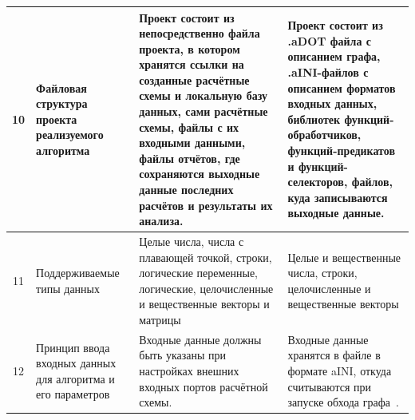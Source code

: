 \begin{landscape}
\begin{longtable}{|c|p{}|p{}|p{}|}
    \hline
    10         & Файловая структура проекта реализуемого алгоритма                                          & Проект состоит из непосредственно файла проекта, в котором хранятся ссылки на созданные расчётные схемы и локальную базу данных, сами расчётные схемы, файлы с их входными данными, файлы отчётов, где сохраняются выходные данные последних расчётов и результаты их анализа.                                                                                                                                                                                                                                                                                                                                                                                    & Проект состоит из \textsf{.aDOT} файла с описанием графа, \textsf{.aINI}-файлов с описанием форматов входных данных, библиотек функций-обработчиков, функций-предикатов и функций-селекторов, файлов, куда записываются выходные данные.                                          \\
    \hline
    11         & Поддерживаемые типы данных                                                                 & Целые числа, числа с плавающей точкой, строки, логические переменные, логические, целочисленные и вещественные векторы и матрицы                                                                                                                                                                                                                                                                                                                                                                                                                                                                                                                                  & Целые и вещественные числа, строки, целочисленные и вещественные векторы                                                                                                                                                                                                          \\
    \hline
    12         & Принцип ввода входных данных для алгоритма и его параметров                                & Входные данные должны быть указаны при настройках внешних входных портов расчётной схемы.                                                                                                                                                                                                                                                                                                                                                                                                                                                                                                                                                                         & Входные данные хранятся в файле в формате \gls{aINI}\cite{SokAINI}, откуда считываются при запуске обхода графа~\cite{SokolovPershin2017}.                                                                                                                                        \\

\end{longtable}
\end{landscape}
